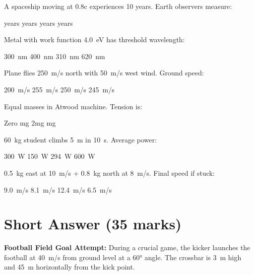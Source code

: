 \documentclass[addpoints]{exam}
\begin{document}
\begin{questions}
\question[1] A spaceship moving at 0.8c experiences 10 years. Earth observers measure:
\begin{choices}
     years
     years
     years
     years
\end{choices}

\question[1] Metal with work function \SI{4.0}{eV} has threshold wavelength:
\begin{choices}
    \choice \SI{300}{nm}
    \choice \SI{400}{nm}
    \correctchoice \SI{310}{nm}
    \choice \SI{620}{nm}
\end{choices}

\question[1] Plane flies \SI{250}{m/s} north with \SI{50}{m/s} west wind. Ground speed:
\begin{choices}
    \choice \SI{200}{m/s}
    \correctchoice \SI{255}{m/s}
    \choice \SI{250}{m/s}
    \choice \SI{245}{m/s}
\end{choices}

\question[1] Equal masses in Atwood machine. Tension is:
\begin{choices}
    \choice Zero
    \choice mg
    \choice 2mg
    \correctchoice mg
\end{choices}

\question[1] \SI{60}{kg} student climbs \SI{5}{m} in \SI{10}{s}. Average power:
\begin{choices}
    \choice \SI{300}{W}
    \choice \SI{150}{W}
    \correctchoice \SI{294}{W}
    \choice \SI{600}{W}
\end{choices}

\question[1] \SI{0.5}{kg} east at \SI{10}{m/s} + \SI{0.8}{kg} north at \SI{8}{m/s}. Final speed if stuck:
\begin{choices}
    \choice \SI{9.0}{m/s}
    \correctchoice \SI{8.1}{m/s}
    \choice \SI{12.4}{m/s}
    \choice \SI{6.5}{m/s}
\end{choices}

\section*{Short Answer (35 marks)}

\question \textbf{Football Field Goal Attempt:} During a crucial game, the kicker launches the football at \SI{40}{m/s} from ground level at a \ang{60} angle. The crossbar is \SI{3}{m} high and \SI{45}{m} horizontally from the kick point.
\end{questions}
\end{document}
